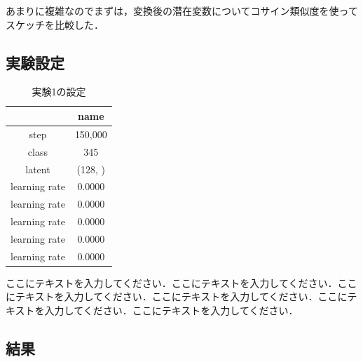 \documentclass[twocolumn]{jarticle}     %
\begin{document}
あまりに複雑なのでまずは，変換後の潜在変数についてコサイン類似度を使ってスケッチを比較した．

\subsection{実験設定}

\begin{table}[tb]
  \begin{center}
    \caption{実験1の設定}
    \begin{tabular}{|c|c|} \hline
       & name \\ \hline
      step & 150,000 \\ \hline
      class & 345 \\ \hline
      latent & (128, ) \\ \hline
      learning rate & 0.0000 \\ \hline
      learning rate & 0.0000 \\ \hline
      learning rate & 0.0000 \\ \hline
      learning rate & 0.0000 \\ \hline
      learning rate & 0.0000 \\ \hline
    \end{tabular}
    \label{tab:setting1}
  \end{center}
\end{table}

ここにテキストを入力してください．ここにテキストを入力してください．ここにテキストを入力してください．ここにテキストを入力してください．ここにテキストを入力してください．ここにテキストを入力してください．

\subsection{結果}
\end{document}

